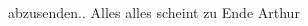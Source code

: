 \begin{ledgroupsized}[t]{13cm}
{{{                  abzusenden.}}}\label{K_L02635-11h}. Alles alles scheint zu Ende\pend
           \pstart \spacefill\mbox{Arthur}\pend{}          \endnumbering{}\end{ledgroupsized}  \newcommand{\dateiname}{L02635}\newcommand{\titel}{Arthur Schnitzler an Paul Goldmann, 19. 3. 1899}\newcommand{\editorInnen}{Martin Anton Müller und Laura Untner}
            \footnotesize
\begin{ledgroupsized}[t]{11.5cm}
\end{ledgroupsized}
         
      
